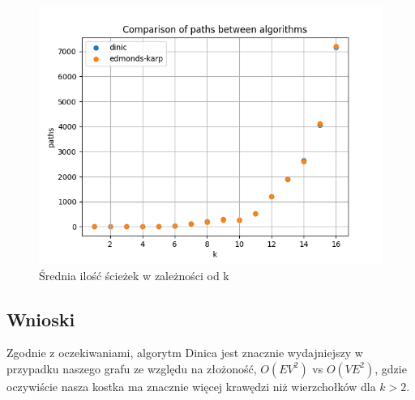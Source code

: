 \documentclass{report}
\begin{document}
\begin{figure}[H]
    \centering
    \includegraphics[scale=0.55]{../ex1_and_4/plots/karp_vs_dinic_paths.png}
    \caption{Średnia ilość ścieżek w zależności od k}
\end{figure}

\subsection*{Wnioski}
Zgodnie z oczekiwaniami, algorytm Dinica jest znacznie
wydajniejszy w przypadku naszego grafu ze względu na złożoność,
$O(EV^2)$ vs $O(VE^2)$, gdzie oczywiście nasza kostka ma znacznie
więcej krawędzi niż wierzchołków dla $k > 2$.
\end{document}
